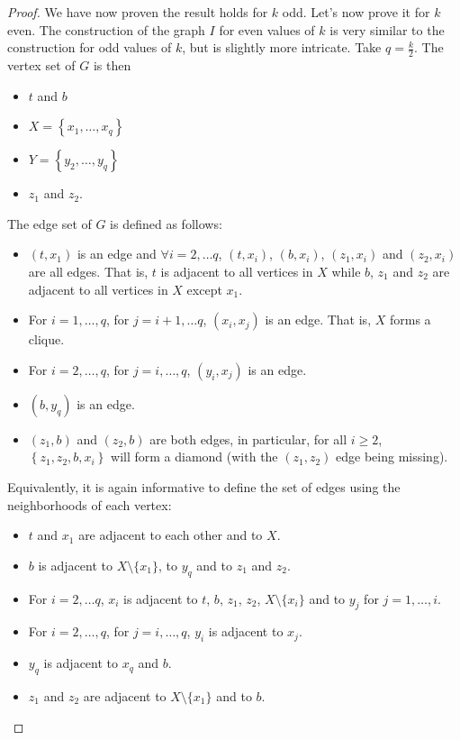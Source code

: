 \documentclass[11pt,letter]{article}
\theoremstyle{remark}
\newcommand{\set}[1]{\left\{#1\right\}}
\begin{document}
\begin{proof}
    
    We have now proven the result holds for $k$ odd. Let's now prove it for $k$ even. 
    The construction of the graph $I$ for even values of $k$ is very similar to the construction for odd values of $k$, but is slightly more intricate. Take $q=\frac{k}{2}$. The vertex set of $G$ is then
    \begin{itemize}
        \item $t$ and $b$
        \item $X=\set{x_1,\dots, x_q}$
        \item $Y=\set{y_2,\dots, y_q}$
        \item $z_1$ and $z_2$.
    \end{itemize}
    The edge set of $G$ is defined as follows:
    \begin{itemize}
        \item $(t,x_1)$ is an edge and $\forall i=2,\dots q$, $(t,x_i)$, $(b,x_i)$, $(z_1,x_i)$ and $(z_2,x_i)$ are all edges. That is, $t$ is adjacent to all vertices in $X$ while $b$, $z_1$ and $z_2$ are adjacent to all vertices in $X$ except $x_1$.
        \item For $i=1,\dots, q$, for $j=i+1,\dots q$, $(x_i,x_j)$ is an edge. That is, $X$ forms a clique.
        \item For $i=2,\dots, q$, for $j=i,\dots, q$, $(y_i,x_j)$ is an edge. 
        \item $(b,y_q)$ is an edge.
        \item $(z_1,b)$ and $(z_2,b)$ are both edges, in particular, for all $i\geq 2$, $\set{z_1,z_2,b,x_i}$ will form a diamond (with the $(z_1,z_2)$ edge being missing).
    \end{itemize}
Equivalently, it is again informative to 
define the set of edges using the neighborhoods of each vertex:
    \begin{itemize}
        \item $t$ and $x_1$ are adjacent to each other and to $X$.
        \item $b$ is adjacent to $X\setminus\{x_1\}$, to $y_q$ and to $z_1$ and $z_2$.
        \item For $i=2,\dots q$, $x_i$ is adjacent to $t$, $b$, $z_1$, $z_2$, $X\setminus \{x_i\}$ and to $y_j$ for $j=1,\dots, i$.
        \item For $i=2,\dots, q$, for $j=i,\dots, q$, $y_i$ is adjacent to $x_j$. 
        \item $y_q$ is adjacent to $x_q$ and $b$.
        \item $z_1$ and $z_2$ are adjacent to $X\setminus \{x_1\}$ and to $b$.

\end{itemize}
\end{proof}
\end{document}

